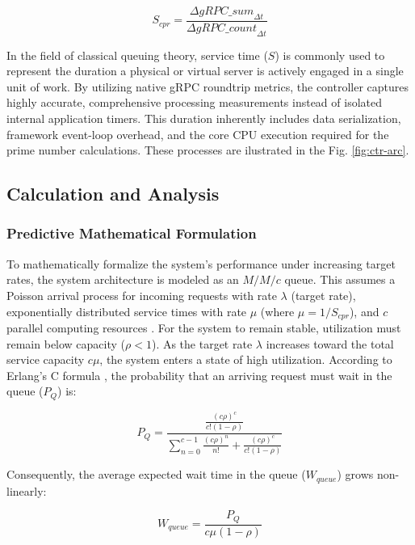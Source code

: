 \documentclass{ieeeaccess}
\begin{document}
\begin{equation}
	S_{cpr} = \frac{\Delta \textit{gRPC_{sum}}_{\Delta t}}{\Delta \textit{gRPC_{count}}_{\Delta t}}
\end{equation}

In the field of classical queuing theory, service time ($S$) is commonly used to represent the duration a physical or virtual server is actively engaged in a single unit of work. By utilizing native gRPC roundtrip metrics, the controller captures highly accurate, comprehensive processing measurements instead of isolated internal application timers. This duration inherently includes data serialization, framework event-loop overhead, and the core CPU execution required for the prime number calculations. These processes are ilustrated in the Fig. \ref{fig:ctr-arc}. 



\subsection{Calculation and Analysis}
\label{sec3.2}

\subsubsection{Predictive Mathematical Formulation}
To mathematically formalize the system's performance under increasing target rates, the system architecture is modeled as an $M/M/c$ queue. This assumes a Poisson arrival process for incoming requests with rate $\lambda$ (target rate), exponentially distributed service times with rate $\mu$ (where $\mu = 1 / S_{cpr}$), and $c$ parallel computing resources \cite{tijms2003first} \cite{banerjee2023mtd}. For the system to remain stable, utilization must remain below capacity ($\rho < 1$). As the target rate $\lambda$ increases toward the total service capacity $c\mu$, the system enters a state of high utilization. According to Erlang's C formula \cite{angus2001introduction}, the probability that an arriving request must wait in the queue ($P_Q$) is:

\begin{equation}
	P_Q = \frac{\frac{(c\rho)^c}{c!(1-\rho)}}{\sum_{n=0}^{c-1} \frac{(c\rho)^n}{n!} + \frac{(c\rho)^c}{c!(1-\rho)}}
\end{equation}

Consequently, the average expected wait time in the queue ($W_{queue}$) grows non-linearly:

\begin{equation}
	W_{queue} = \frac{P_Q}{c\mu(1-\rho)}
\end{equation}
\end{document}
